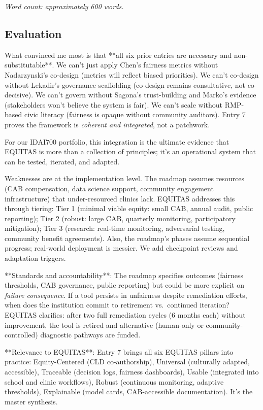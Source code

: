 \documentclass[12pt,twoside]{article}
\begin{document}
\emph{Word count: approximately 600 words.}

\subsection*{Evaluation}

What convinced me most is that **all six prior entries are necessary and non-substitutable**. We can't just apply Chen's fairness metrics without Nadarzynski's co-design (metrics will reflect biased priorities). We can't co-design without Lekadir's governance scaffolding (co-design remains consultative, not co-decisive). We can't govern without Sagona's trust-building and Marko's evidence (stakeholders won't believe the system is fair). We can't scale without RMP-based civic literacy (fairness is opaque without community auditors). Entry 7 proves the framework is \textit{coherent and integrated}, not a patchwork.

For our IDAI700 portfolio, this integration is the ultimate evidence that EQUITAS is more than a collection of principles; it's an operational system that can be tested, iterated, and adapted.

Weaknesses are at the implementation level. The roadmap assumes resources (CAB compensation, data science support, community engagement infrastructure) that under-resourced clinics lack. EQUITAS addresses this through tiering: Tier 1 (minimal viable equity: small CAB, annual audit, public reporting); Tier 2 (robust: large CAB, quarterly monitoring, participatory mitigation); Tier 3 (research: real-time monitoring, adversarial testing, community benefit agreements). Also, the roadmap's phases assume sequential progress; real-world deployment is messier. We add checkpoint reviews and adaptation triggers.

**Standards and accountability**: The roadmap specifies outcomes (fairness thresholds, CAB governance, public reporting) but could be more explicit on \textit{failure consequence}. If a tool persists in unfairness despite remediation efforts, when does the institution commit to retirement vs.\ continued iteration? EQUITAS clarifies: after two full remediation cycles (6 months each) without improvement, the tool is retired and alternative (human-only or community-controlled) diagnostic pathways are funded.

**Relevance to EQUITAS**: Entry 7 brings all six EQUITAS pillars into practice: Equity-Centered (CLD co-authorship), Universal (culturally adapted, accessible), Traceable (decision logs, fairness dashboards), Usable (integrated into school and clinic workflows), Robust (continuous monitoring, adaptive thresholds), Explainable (model cards, CAB-accessible documentation). It's the master synthesis.
\end{document}
